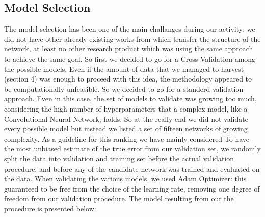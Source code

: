 \subsection{Model Selection}
The model selection has been one of the main challanges during our activity: we did not have other already existing works from which transfer the structure of the network, at least no other research product which was using the same approach to achieve the same goal. So first we decided to go for a Cross Validation among the possible models. Even if the amount of data that we managed to harvest (section 4) was enough to proceed with this idea, the methodology appeared to be computationally unfeasible. So we decided to go for a standerd validation approach. Even in this case, the set of models to validate was growing too much, considering the high number of hyperparameters that a complex model, like a Convolutional Neural Network, holds. So at the really end we did not validate every possible model but instead we listed a set of fifteen networks of growing complexity. As a guideline for this ranking we have mainly considered 
To have the most unbiased estimate of the true error from our validation set, we randomly split the data into validation and training set before the actual validation procedure, and before any of the candidate network was trained and evaluated on the data.
When validating the various models, we used Adam Optimizer: this guaranteed to be free from the choice of the learning rate, removing one degree of freedom from our validation procedure.
The model resulting from our the procedure is presented below:
\\
